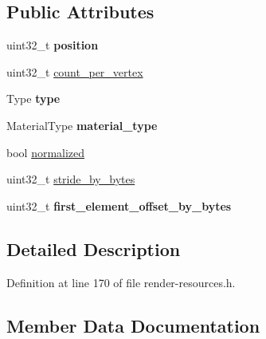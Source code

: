 \subsection*{Public Attributes}
\begin{DoxyCompactItemize}
\item 
\mbox{\label{structnabla_1_1renderer_1_1_layout_info_ab257d131094218504743e0160e04bedc}} 
uint32\+\_\+t {\bfseries position}
\item 
uint32\+\_\+t \mbox{\hyperlink{structnabla_1_1renderer_1_1_layout_info_a1b4e43b8e2a965517096e3634abdb41e}{count\+\_\+per\+\_\+vertex}}
\item 
\mbox{\label{structnabla_1_1renderer_1_1_layout_info_a3be6ab991637b803b2d7e9fc6859dde6}} 
Type {\bfseries type}
\item 
\mbox{\label{structnabla_1_1renderer_1_1_layout_info_a0f091c845626e6987fc2dda54e9b9574}} 
Material\+Type {\bfseries material\+\_\+type}
\item 
bool \mbox{\hyperlink{structnabla_1_1renderer_1_1_layout_info_ae029150fe1e95759d847a7e9cb6ce57e}{normalized}}
\item 
uint32\+\_\+t \mbox{\hyperlink{structnabla_1_1renderer_1_1_layout_info_ac790cb5c58e554cb3b9ec216c4081cfc}{stride\+\_\+by\+\_\+bytes}}
\item 
\mbox{\label{structnabla_1_1renderer_1_1_layout_info_a32fa372ce559ac7d1ce46db88aa4289e}} 
uint32\+\_\+t {\bfseries first\+\_\+element\+\_\+offset\+\_\+by\+\_\+bytes}
\end{DoxyCompactItemize}


\subsection{Detailed Description}


Definition at line 170 of file render-\/resources.\+h.



\subsection{Member Data Documentation}
\mbox{\label{structnabla_1_1renderer_1_1_layout_info_a1b4e43b8e2a965517096e3634abdb41e}} 
